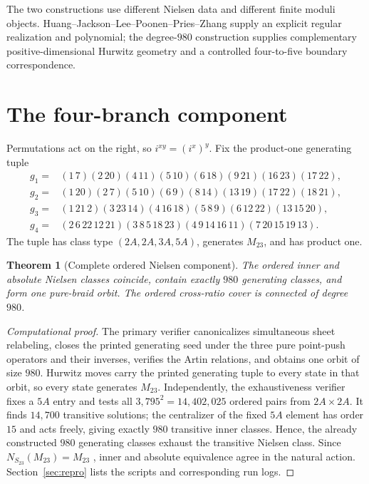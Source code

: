 \documentclass[11pt]{article}
\newtheorem{theorem}{Theorem}[section]
\theoremstyle{remark}
\begin{document}
The two constructions use different Nielsen data and different finite moduli objects.  Huang--Jackson--Lee--Poonen--Pries--Zhang supply an explicit regular realization and polynomial; the degree-$980$ construction supplies complementary positive-dimensional Hurwitz geometry and a controlled four-to-five boundary correspondence.

\section{The four-branch component}\label{sec:four}

Permutations act on the right, so $i^{xy}=(i^x)^y$.  Fix the product-one generating tuple
\begin{align*}
 g_1={}&(1\,7)(2\,20)(4\,11)(5\,10)(6\,18)(9\,21)(16\,23)(17\,22),\\
 g_2={}&(1\,20)(2\,7)(5\,10)(6\,9)(8\,14)(13\,19)(17\,22)(18\,21),\\
 g_3={}&(1\,21\,2)(3\,23\,14)(4\,16\,18)(5\,8\,9)(6\,12\,22)(13\,15\,20),\\
 g_4={}&(2\,6\,22\,12\,21)(3\,8\,5\,18\,23)(4\,9\,14\,16\,11)(7\,20\,15\,19\,13).
\end{align*}
The tuple has class type $(2A,2A,3A,5A)$, generates $M_{23}$, and has product one.

\begin{theorem}[Complete ordered Nielsen component]\label{thm:orbit}
The ordered inner and absolute Nielsen classes coincide, contain exactly $980$ generating classes, and form one pure-braid orbit.  The ordered cross-ratio cover is connected of degree $980$.
\end{theorem}

\begin{proof}[Computational proof]
The primary verifier canonicalizes simultaneous sheet relabeling, closes the printed generating seed under the three pure point-push operators and their inverses, verifies the Artin relations, and obtains one orbit of size $980$.  Hurwitz moves carry the printed generating tuple to every state in that orbit, so every state generates $M_{23}$.  Independently, the exhaustiveness verifier fixes a $5A$ entry and tests all $3{,}795^2=14{,}402{,}025$ ordered pairs from $2A\times2A$.  It finds $14{,}700$ transitive solutions; the centralizer of the fixed $5A$ element has order $15$ and acts freely, giving exactly $980$ transitive inner classes.  Hence, the already constructed $980$ generating classes exhaust the transitive Nielsen class.  Since $N_{S_{23}}(M_{23})=M_{23}$ \cite{Atlas}, inner and absolute equivalence agree in the natural action.  Section~\ref{sec:repro} lists the scripts and corresponding run logs.
\end{proof}
\end{document}
